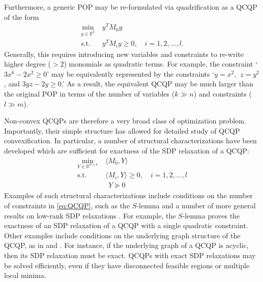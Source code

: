 \documentclass[10pt]{article} %
\theoremstyle{plain}
\theoremstyle{definition}
\theoremstyle{remark}
\begin{document}
Furthermore, a generic POP may be re-formulated via quadrification \citep{sherali2013reformulation, dalkiran2018linear} as a QCQP of the form
\begin{equation}
\begin{aligned}
    \min_{y \in \mathbb{R}^k}~& y^T M_0 y \\
    \text{s.t.}~& y^T M_i y \geq 0, \quad i = 1, 2, ..., l.
\end{aligned}
\label{eq:QCQP}
\end{equation}
Generally, this requires introducing new variables and constraints to re-write higher degree ($> 2$) monomials as quadratic terms. For example, the constraint `$3x^6 - 2x^2 \geq 0$' may be equivalently represented by the constraints `$y = x^2$, $~z = y^2$, and $3yz - 2y \geq 0$.'
As a result, the equivalent QCQP may be much larger than the original POP in terms of the number of variables ($k \gg n$) and constraints ($l \gg m$). 

Non-convex QCQPs are therefore a very broad class of optimization problem. Importantly, their simple structure has allowed for detailed study of QCQP convexification. In particular, a number of structural characterizations have been developed which are sufficient for exactness of the SDP relaxation of a QCQP:
\begin{equation}
\begin{aligned}
    \min_{Y \in \mathbb{R}^{n \times n}}~& \langle M_0, Y \rangle \\
    \text{s.t.}~~~& \langle M_i, Y\rangle \geq 0, \quad i = 1, 2, ..., l\\
    &~~ Y \succeq 0
\end{aligned}
\label{eq:SDP_relaxation}
\end{equation}
Examples of such structural characterizations include conditions on the number of constraints in \eqref{eq:QCQP}, such as the $S$-lemma \citep{boyd2004convex} and a number of more general results on low-rank SDP relaxations \citep{lemon2016low}. For example, the $S$-lemma proves the exactness of an SDP relaxation of a QCQP with a single quadratic constraint. Other examples include conditions on the underlying graph structure of the QCQP, as in \citet{sojoudi2014exactness} and \citet{bose2015quadratically}. For instance, if the underlying graph of a QCQP is acyclic, then its SDP relaxation must be exact. QCQPs with exact SDP relaxations may be solved efficiently, even if they have disconnected feasible regions or multiple local minima.
\end{document}
